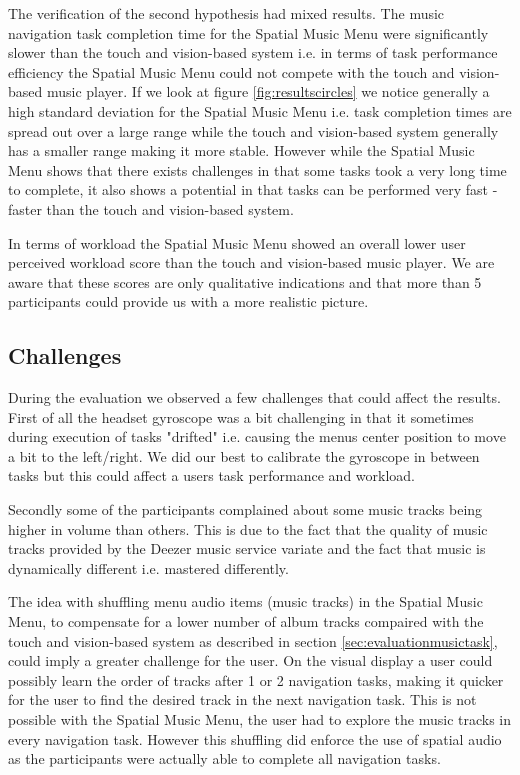 The verification of the second hypothesis had mixed results. The music navigation task completion time for the Spatial Music Menu were significantly slower than the touch and vision-based system i.e. in terms of task performance efficiency the Spatial Music Menu could not compete with the touch and vision-based music player. If we look at figure \ref{fig:resultscircles} we notice generally a high standard deviation for the Spatial Music Menu i.e. task completion times are spread out over a large range while the touch and vision-based system generally has a smaller range making it more stable. However while the Spatial Music Menu shows that there exists challenges in that some tasks took a very long time to complete, it also shows a potential in that tasks can be performed very fast - faster than the touch and vision-based system.

In terms of workload the Spatial Music Menu showed an overall lower user perceived workload score than the touch and vision-based music player. We are aware that these scores are only qualitative indications and that more than 5 participants could provide us with a more realistic picture.
	
\subsection{Challenges}
During the evaluation we observed a few challenges that could affect the results. First of all the headset gyroscope was a bit challenging in that it sometimes during execution of tasks "drifted" i.e. causing the menus center position to move a bit to the left/right. We did our best to calibrate the gyroscope in between tasks but this could affect a users task performance and workload.

Secondly some of the participants complained about some music tracks being higher in volume than others. This is due to the fact that the quality of music tracks provided by the Deezer music service variate and the fact that music is dynamically different i.e. mastered differently.

The idea with shuffling menu audio items (music tracks) in the Spatial Music Menu, to compensate for a lower number of album tracks compaired with the touch and vision-based system as described in section \ref{sec:evaluationmusictask}, could imply a greater challenge for the user. On the visual display a user could possibly learn the order of tracks after 1 or 2 navigation tasks, making it quicker for the user to find the desired track in the next navigation task. This is not possible with the Spatial Music Menu, the user had to explore the music tracks in every navigation task. However this shuffling did enforce the use of spatial audio as the participants were actually able to complete all navigation tasks.

